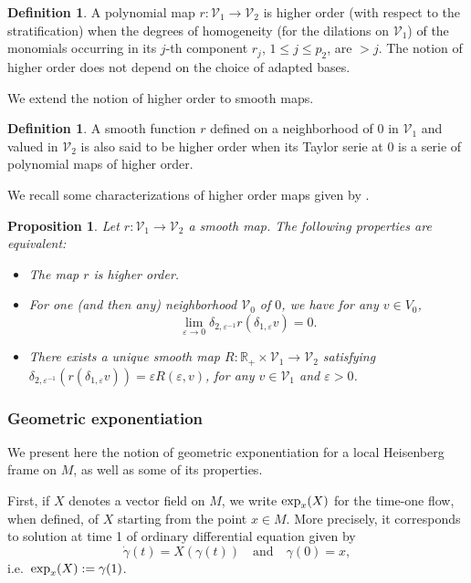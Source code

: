 \documentclass[12pt,a4paper]{amsart}
\theoremstyle{plain}
\newtheorem{proposition}[theorem]{Proposition}
\theoremstyle{definition}
\newtheorem{definition}[theorem]{Definition}
\theoremstyle{remark}
\numberwithin{equation}{section}
\theoremstyle{definition}
\def\eps{\varepsilon}
\def\R{{\mathbb R}}%
\def \exp{{\rm exp}}
\def \cV{\mathcal{V}}
\numberwithin{equation}{section}
\begin{document}
\begin{definition}
    \label{def:higherorder}
    A polynomial map $r:\cV_1\rightarrow\cV_2$ is higher order (with respect to the stratification) when the degrees of homogeneity (for the dilations on $\cV_1$) of the monomials occurring in its $j$-th component $r_j$, $1\leq j\leq p_2$, are $> j$. The notion of higher order does not depend on the choice of adapted bases.
\end{definition}

We extend the notion of higher order to smooth maps.

\begin{definition}
    \label{def:higherordersmooth}
    A smooth function $r$ defined on a neighborhood of $0$ in $\cV_1$ and valued in $\cV_2$ is also said to be higher order when its Taylor serie at $0$ is a serie of polynomial maps of higher order.
\end{definition}

We recall some characterizations of higher order maps given by \cite[Proposition 4.5]{FFF24}.

\begin{proposition}
    Let $r:\cV_1\rightarrow\cV_2$ a smooth map. The following properties are equivalent:
    \begin{itemize}
        \item[(i)] The map $r$ is higher order.
        \item[(ii)] For one (and then any) neighborhood $\cV_0$ of $0$, we have for any $v\in V_0$,
        \begin{equation*}
            \lim_{\eps\rightarrow 0} \delta_{2,\eps^{-1}}r(\delta_{1,\eps} v) = 0.
        \end{equation*}
        \item[(iii)] There exists a unique smooth map $R: \R_{+}\times\cV_1 \rightarrow \cV_2$ satisfying $\delta_{2,\eps^{-1}}(r(\delta_{1,\eps} v)) = \eps R(\eps,v)$, for any $v\in\cV_1$ and $\eps>0$.
    \end{itemize}
\end{proposition}

\subsubsection{Geometric exponentiation}

We present here the notion of geometric exponentiation for a local Heisenberg frame on $M$, as well as some of its properties. 

First, if $X$ denotes a vector field on $M$, we write $\exp_x(X)$ for the time-one flow, when defined, of $X$ starting from the point $x\in M$. More precisely, it corresponds to solution at time 1 of ordinary differential equation given by 
\begin{equation*}
    \Dot{\gamma}(t) = X(\gamma(t))\quad\mbox{and}\quad \gamma(0) = x,
\end{equation*}
i.e.~$\exp_x(X) := \gamma(1)$.
\end{document}
